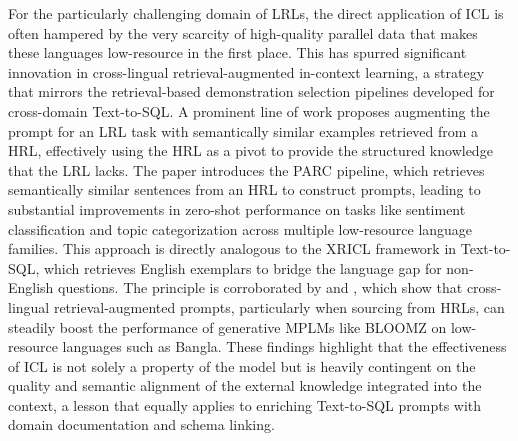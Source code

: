 \documentclass[11pt]{article}
\begin{document}
For the particularly challenging domain of LRLs, the direct application of ICL is often hampered by the very scarcity of high-quality parallel data that makes these languages low-resource in the first place. This has spurred significant innovation in cross-lingual retrieval-augmented in-context learning, a strategy that mirrors the retrieval-based demonstration selection pipelines developed for cross-domain Text-to-SQL. A prominent line of work proposes augmenting the prompt for an LRL task with semantically similar examples retrieved from a HRL, effectively using the HRL as a pivot to provide the structured knowledge that the LRL lacks. The paper \cite{ref535} introduces the PARC pipeline, which retrieves semantically similar sentences from an HRL to construct prompts, leading to substantial improvements in zero-shot performance on tasks like sentiment classification and topic categorization across multiple low-resource language families. This approach is directly analogous to the XRICL framework in Text-to-SQL, which retrieves English exemplars to bridge the language gap for non-English questions. The principle is corroborated by \cite{ref536} and \cite{ref537}, which show that cross-lingual retrieval-augmented prompts, particularly when sourcing from HRLs, can steadily boost the performance of generative MPLMs like BLOOMZ on low-resource languages such as Bangla. These findings highlight that the effectiveness of ICL is not solely a property of the model but is heavily contingent on the quality and semantic alignment of the external knowledge integrated into the context, a lesson that equally applies to enriching Text-to-SQL prompts with domain documentation and schema linking.
\end{document}
